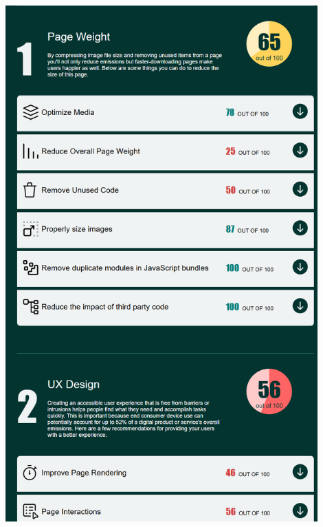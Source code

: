 \documentclass[12pt,a4paper]{report}
\begin{document}
\begin{center}
  \includegraphics[width=0.9\textwidth]{imagenes/Ecograder_4.png}
\end{center}
\end{document}
